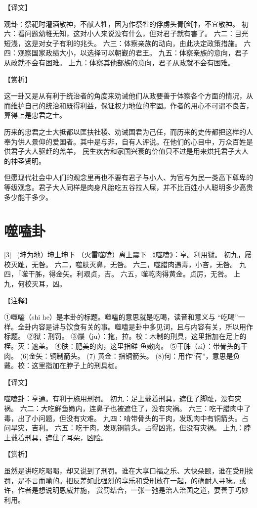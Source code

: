 \documentclass[12pt,UTF8]{ctexbook}
\begin{document}
【译文】

观卦：祭祀时灌酒敬神，不献人牲，因为作祭牲的俘虏头青脸肿，不宜敬神。
初六：看问题幼稚无知，这对小人来说没有什么，但对君子就有害了。
六二：目光短浅，这是对女子有利的兆头。
六三：体察亲族的动向，由此决定政策措施。
六四：观察国家政绩大小，以选择可以朝觐的君王。
九五：体察亲族的意向，君子从政就不会有困难。
上九：体察其他部族的意向，君子从政就不会有困难。

【赏析】

这一卦又是从有利于统治者的角度来劝诫他们从政要善于体察各个方面的情况，从而维护自己的统治和既得利益，保证权力地位的牢固。作者的用心不可谓不良苦，算得上是忠君之士。

历来的忠君之士大抵都以匡扶社稷、劝诫国君为己任，而历来的史传都把这样的人奉为供人景仰的爱国者。其中是与非，自有人评说。在他们的心目中，万众百姓是供君子大人驱赶的羔羊， 民生疾苦和家国兴衰的价值只不过是用来烘托君子大人的神圣贤明。

但愿现代社会中人们的观念里再也不要有君子与小人、为官与为民一类高下尊卑的等级观念。君子大人同样是肉身凡胎吃五谷拉人屎，并不比百姓小人聪明多少高贵多少能干多少。

\chapter{噬嗑卦}
[3] \ (坤为地）坤上坤下
（火雷噬嗑）离上震下
《噬嗑》：亨。利用狱。
初九，屦校灭趾，无咎。
六二，噬肤灭鼻，无咎。
六三，噬腊肉遇毒，小吝，无咎。
九四，「噬干胏，得金矢。利艰贞，吉。
六五，噬乾肉得黄金。贞厉，无咎。
上九，何校灭耳，凶。

【注释】

①噬嗑（shi he）是本卦的标题。噬嗑的意思就是吃喝，读音和意义与 “吃喝”一样。全卦内容是讲与饮食有关的事。噬嗑是卦中多见词，且与内容有关，所以用作标题。
②狱：刑罚。
③屦（ju）：拖，拉。校：木制的刑具，这里指加在足上的桎。灭：遮盖。
④肤：肥美的肉，这里指鲜 鱼嫩肉。
⑤干胏（zi）：带骨头的干肉。
(6)金矢：铜制箭头。
(7) 黄金：指铜箭头。
(8)何：用作“荷”，意思是负戴。校：这里指加在脖子上的刑具枷。

【译文】

噬嗑卦：亨通。有利于施用刑罚。
初九：足上戴着刑具，遮住了脚趾，没有灾祸。
六二：大吃鲜鱼嫩内，连鼻子也被遮住了，没有灾祸。
六三：吃干腊肉中了毒，出了小问题，但没有灾难。
九四：啃带骨头的干肉，发现肉中有铜箭头。占问旱灾，吉利。
六五：吃干肉，发现铜箭头。占得凶兆，但没有灾祸。
上九：脖上戴着刑具，遮住了耳朵，凶险。

【赏析】

虽然是讲吃吃喝喝，却又说到了刑罚。谁在大享口福之乐、大快朵颐，谁在受刑挨罚，是不言而喻的。把反差如此强烈的享乐和受刑放在一起，的确耐人寻味。或许，作者是想说明恩威并施， 赏罚结合，一张一弛是治人治国之道，要善于巧妙利用。
\end{document}
